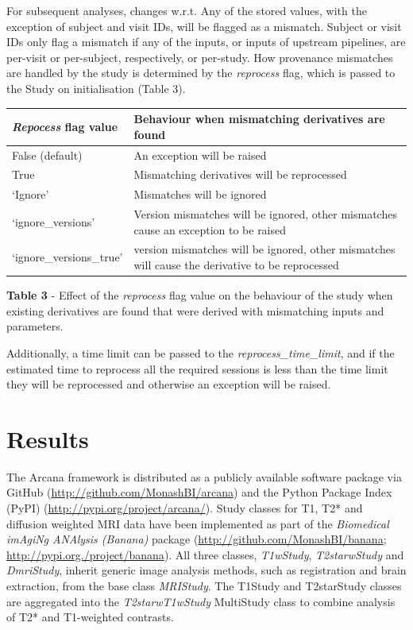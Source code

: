 For subsequent analyses, changes w.r.t. Any of the stored values, with
the exception of subject and visit IDs, will be flagged as a mismatch.
Subject or visit IDs only flag a mismatch if any of the inputs, or
inputs of upstream pipelines, are per-visit or per-subject,
respectively, or per-study. How provenance mismatches are handled by the
study is determined by the \emph{reprocess} flag, which is passed to the
Study on initialisation (Table 3).

\begin{longtable}[]{@{}ll@{}}
\toprule
\textbf{\emph{Repocess} flag value} & \textbf{Behaviour when mismatching
derivatives are found}\tabularnewline
\midrule
\endhead
False (default) & An exception will be raised\tabularnewline
True & Mismatching derivatives will be reprocessed\tabularnewline
`Ignore' & Mismatches will be ignored\tabularnewline
`ignore\_versions' & Version mismatches will be ignored, other
mismatches cause an exception to be raised\tabularnewline
`ignore\_versions\_true' & version mismatches will be ignored, other
mismatches will cause the derivative to be reprocessed\tabularnewline
\bottomrule
\end{longtable}

\textbf{Table 3} - Effect of the \emph{reprocess} flag value on the
behaviour of the study when existing derivatives are found that were
derived with mismatching inputs and parameters.

Additionally, a time limit can be passed to the
\emph{reprocess\_time\_limit}, and if the estimated time to reprocess
all the required sessions is less than the time limit they will be
reprocessed and otherwise an exception will be raised.

\section{Results}
\label{results}

The Arcana framework is distributed as a publicly available software
package via GitHub
(\href{http://github.com/MonashBI/arcana}{{http://github.com/MonashBI/arcana}})
and the Python Package Index (PyPI)
(\href{https://pypi.org/project/arcana/}{{http://pypi.org/project/arcana/}}).
Study classes for T1, T2* and diffusion weighted MRI data have been
implemented as part of the \emph{Biomedical imAgiNg ANAlysis (Banana)}
package
(\href{https://github.com/MonashBI/banana}{{http://github.com/MonashBI/banana}};
\href{http://pypi.org./project/banana}{{http://pypi.org./project/banana}}).
All three classes, \emph{T1wStudy}, \emph{T2starwStudy} and
\emph{DmriStudy}, inherit generic image analysis methods, such as
registration and brain extraction, from the base class \emph{MRIStudy}.
The T1Study and T2starStudy classes are aggregated into the
\emph{T2starwT1wStudy} MultiStudy class to combine analysis of T2* and
T1-weighted contrasts.

